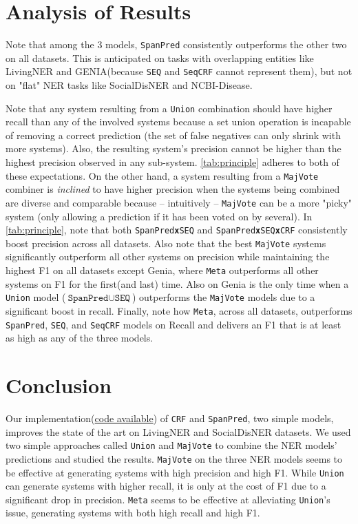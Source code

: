 \documentclass[11pt]{article}
\begin{document}
\section{Analysis of Results}
Note that among the 3 models, \texttt{SpanPred} consistently outperforms the other two on all datasets. This is anticipated on tasks with overlapping entities like LivingNER and GENIA(because \texttt{SEQ} and \texttt{SeqCRF} cannot represent them), but not on "flat" NER tasks like SocialDisNER and NCBI-Disease. \par
Note that any system resulting from a \texttt{Union} combination should have higher recall than any of the involved systems because a set union operation is incapable of removing a correct prediction (the set of false negatives can only shrink with more systems). Also, the resulting system's precision cannot be higher than the highest precision observed in any sub-system.   \autoref{tab:principle} adheres to both of these expectations. On the other hand, a system resulting from a \texttt{MajVote} combiner is \textit{inclined} to have higher precision when the systems being combined are diverse and comparable because -- intuitively --  \texttt{MajVote} can be a more "picky" system (only allowing a prediction if it has been voted on by several). In \autoref{tab:principle}, note that both \texttt{SpanPred\textbf{x}SEQ} and \texttt{SpanPred\textbf{x}SEQ\textbf{x}CRF} consistently boost precision across all datasets. Also note that the best \texttt{MajVote} systems significantly outperform all other systems on precision while maintaining the highest F1 on all datasets except Genia, where \texttt{Meta} outperforms all other systems on F1 for the first(and last) time. Also on Genia is the only time when a \texttt{Union} model ($\texttt{SpanPred} \cup \texttt{SEQ}$) outperforms the \texttt{MajVote} models due to a significant boost in recall. Finally, note how \texttt{Meta}, across all datasets, outperforms \texttt{SpanPred}, \texttt{SEQ}, and \texttt{SeqCRF} models on Recall and delivers an F1 that is at least as high as any of the three models.\par

\section{Conclusion}
Our implementation(\href{https://github.com/flyingmothman/bionlp}{code available}) of \texttt{CRF} and \texttt{SpanPred}, two simple models, improves the state of the art on LivingNER and SocialDisNER datasets. We used two simple approaches called \texttt{Union} and \texttt{MajVote} to combine the NER models' predictions and studied the results. \texttt{MajVote} on the three NER models seems to be effective at generating systems with high precision and high F1. While \texttt{Union} can generate systems with higher recall, it is only at the cost of F1 due to a significant drop in precision. \texttt{Meta} seems to be effective at alleviating \texttt{Union}'s issue, generating systems with both high recall and high F1.







 
\end{document}
